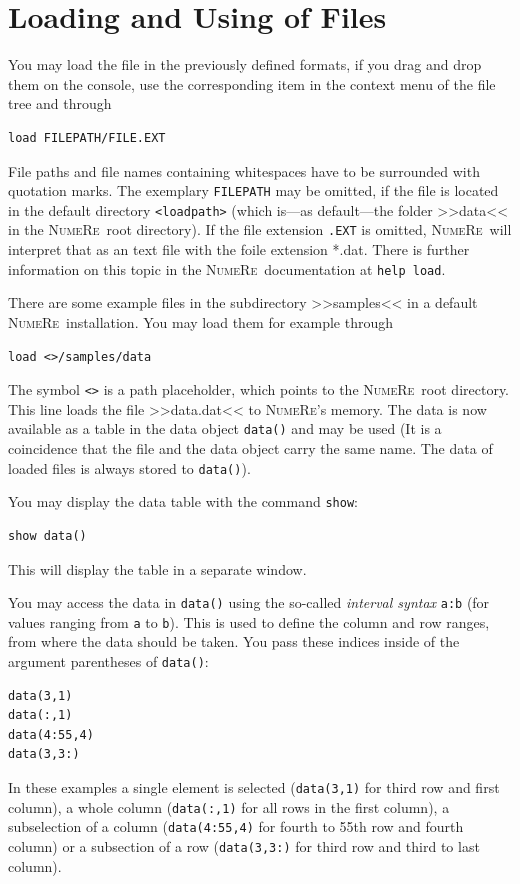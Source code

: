 \documentclass[DIV=14,headsepline,footsepline]{scrbook}
\newcommand{\NR}{\textsc{Nu\-me\-Re}}
\begin{document}
			\section{Loading and Using of Files}
				You may load the file in the previously defined formats, if you drag and drop them on the console, use the corresponding item in the context menu of the file tree and through
				\begin{lstlisting}
load FILEPATH/FILE.EXT
				\end{lstlisting}
				File paths and file names containing whitespaces have to be surrounded with quotation marks. The exemplary \verb+FILEPATH+ may be omitted, if the file is located in the default directory \verb+<loadpath>+ (which is---as default---the folder >>data<< in the \NR\ root directory). If the file extension \verb+.EXT+ is omitted, \NR\ will interpret that as an text file with the foile extension *.dat. There is further information on this topic in the \NR\ documentation at \verb+help load+.
				
				There are some example files in the subdirectory >>samples<< in a default \NR\ installation. You may load them for example through
				\begin{lstlisting}
load <>/samples/data
				\end{lstlisting}
				The symbol \verb+<>+ is a path placeholder, which points to the \NR\ root directory. This line loads the file >>data.dat<< to \NR's memory. The data is now available as a table in the data object \verb+data()+ and may be used (It is a coincidence that the file and the data object carry the same name. The data of loaded files is always stored to \verb+data()+).
				
				You may display the data table with the command \verb+show+:
				\begin{lstlisting}
show data()
				\end{lstlisting}
				This will display the table in a separate window.
				
				You may access the data in \verb+data()+ using the so-called \emph{interval syntax} \verb+a:b+ (for values ranging from \verb+a+ to \verb+b+). This is used to define the column and row ranges, from where the data should be taken. You pass these indices inside of the argument parentheses of \verb+data()+:
				\begin{lstlisting}
data(3,1)
data(:,1)
data(4:55,4)
data(3,3:)
				\end{lstlisting}
				In these examples a single element is selected (\verb+data(3,1)+ for third row and first column), a whole column (\verb+data(:,1)+ for all rows in the first column), a subselection of a column (\verb+data(4:55,4)+ for fourth to 55th row and fourth column) or a subsection of a row (\verb+data(3,3:)+ for third row and third to last column).
				
\end{document}
